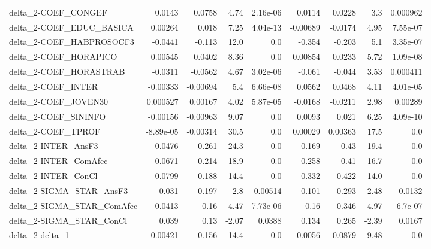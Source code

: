 \begin{tabular}{lrrrrrrrr}
delta\_2-COEF\_CONGEF                 &      0.0143 &       0.0758 &    4.74 & 2.16e-06 &     0.0114 &      0.0228 &          3.3 &      0.000962 \\
delta\_2-COEF\_EDUC\_BASICA            &     0.00264 &        0.018 &    7.25 & 4.04e-13 &   -0.00689 &     -0.0174 &         4.95 &      7.55e-07 \\
delta\_2-COEF\_HABPROSOCF3            &     -0.0441 &       -0.113 &    12.0 &      0.0 &     -0.354 &      -0.203 &          5.1 &      3.35e-07 \\
delta\_2-COEF\_HORAPICO               &     0.00545 &       0.0402 &    8.36 &      0.0 &    0.00854 &      0.0233 &         5.72 &      1.09e-08 \\
delta\_2-COEF\_HORASTRAB              &     -0.0311 &      -0.0562 &    4.67 & 3.02e-06 &     -0.061 &      -0.044 &         3.53 &      0.000411 \\
delta\_2-COEF\_INTER                  &    -0.00333 &     -0.00694 &     5.4 & 6.66e-08 &     0.0562 &      0.0468 &         4.11 &      4.01e-05 \\
delta\_2-COEF\_JOVEN30                &    0.000527 &      0.00167 &    4.02 & 5.87e-05 &    -0.0168 &     -0.0211 &         2.98 &       0.00289 \\
delta\_2-COEF\_SININFO                &    -0.00156 &     -0.00963 &    9.07 &      0.0 &     0.0093 &       0.021 &         6.25 &      4.09e-10 \\
delta\_2-COEF\_TPROF                  &   -8.89e-05 &     -0.00314 &    30.5 &      0.0 &    0.00029 &     0.00363 &         17.5 &           0.0 \\
delta\_2-INTER\_AnsF3                 &     -0.0476 &       -0.261 &    24.3 &      0.0 &     -0.169 &       -0.43 &         19.4 &           0.0 \\
delta\_2-INTER\_ComAfec               &     -0.0671 &       -0.214 &    18.9 &      0.0 &     -0.258 &       -0.41 &         16.7 &           0.0 \\
delta\_2-INTER\_ConCl                 &     -0.0799 &       -0.188 &    14.4 &      0.0 &     -0.332 &      -0.422 &         14.0 &           0.0 \\
delta\_2-SIGMA\_STAR\_AnsF3            &       0.031 &        0.197 &    -2.8 &  0.00514 &      0.101 &       0.293 &        -2.48 &        0.0132 \\
delta\_2-SIGMA\_STAR\_ComAfec          &      0.0413 &         0.16 &   -4.47 & 7.73e-06 &       0.16 &       0.346 &        -4.97 &       6.7e-07 \\
delta\_2-SIGMA\_STAR\_ConCl            &       0.039 &         0.13 &   -2.07 &   0.0388 &      0.134 &       0.265 &        -2.39 &        0.0167 \\
delta\_2-delta\_1                     &    -0.00421 &       -0.156 &    14.4 &      0.0 &     0.0056 &      0.0879 &         9.48 &           0.0 \\
\bottomrule
\end{tabular}
